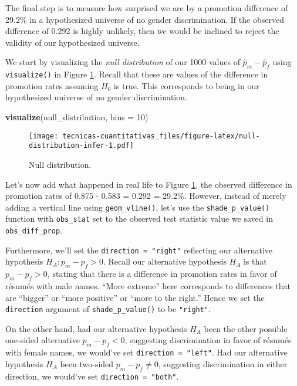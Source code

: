 \documentclass[
]{book}
\newenvironment{Shaded}{\begin{snugshade}}{\end{snugshade}}
\newcommand{\DataTypeTok}[1]{\textcolor[rgb]{0.13,0.29,0.53}{#1}}
\newcommand{\DecValTok}[1]{\textcolor[rgb]{0.00,0.00,0.81}{#1}}
\newcommand{\KeywordTok}[1]{\textcolor[rgb]{0.13,0.29,0.53}{\textbf{#1}}}
\newcommand{\NormalTok}[1]{#1}
\begin{document}
The final step is to measure how surprised we are by a promotion difference of 29.2\% in a hypothesized universe of no gender discrimination. If the observed difference of 0.292 is highly unlikely, then we would be inclined to reject the validity of our hypothesized universe.

We start by visualizing the \emph{null distribution} of our 1000 values of \(\widehat{p}_{m} - \widehat{p}_{f}\) using \texttt{visualize()}  in Figure \ref{fig:null-distribution-infer}. Recall that these are values of the difference in promotion rates assuming \(H_0\) is true. This corresponds to being in our hypothesized universe of no gender discrimination.

\begin{Shaded}
\begin{Highlighting}[]
\KeywordTok{visualize}\NormalTok{(null_distribution, }\DataTypeTok{bins =} \DecValTok{10}\NormalTok{)}
\end{Highlighting}
\end{Shaded}

\begin{figure}
\centering
\texttt{[image: tecnicas-cuantitativas\_files/figure-latex/null-distribution-infer-1.pdf]}
\caption{\label{fig:null-distribution-infer}Null distribution.}
\end{figure}

Let's now add what happened in real life to Figure \ref{fig:null-distribution-infer}, the observed difference in promotion rates of 0.875 - 0.583 = 0.292 = 29.2\%. However, instead of merely adding a vertical line using \texttt{geom\_vline()}, let's use the  \texttt{shade\_p\_value()} function with \texttt{obs\_stat} set to the observed test statistic value we saved in \texttt{obs\_diff\_prop}.

Furthermore, we'll set the \texttt{direction\ =\ "right"} reflecting our alternative hypothesis \(H_A: p_{m} - p_{f} > 0\). Recall our alternative hypothesis \(H_A\) is that \(p_{m} - p_{f} > 0\), stating that there is a difference in promotion rates in favor of résumés with male names. ``More extreme'' here corresponds to differences that are ``bigger'' or ``more positive'' or ``more to the right.'' Hence we set the \texttt{direction} argument of \texttt{shade\_p\_value()} to be \texttt{"right"}.

On the other hand, had our alternative hypothesis \(H_A\) been the other possible one-sided alternative \(p_{m} - p_{f} < 0\), suggesting discrimination in favor of résumés with female names, we would've set \texttt{direction\ =\ "left"}. Had our alternative hypothesis \(H_A\) been two-sided \(p_{m} - p_{f} \neq 0\), suggesting discrimination in either direction, we would've set \texttt{direction\ =\ "both"}.
\end{document}
